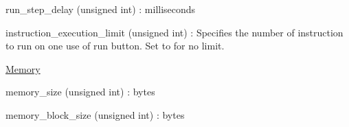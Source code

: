 \begin{DoxyItemize}
\begin{DoxyItemize}
\begin{DoxyItemize}
\item {\ttfamily run\+\_\+step\+\_\+delay} (unsigned int) \+: milliseconds
\item {\ttfamily instruction\+\_\+execution\+\_\+limit} (unsigned int) \+: Specifies the number of instruction to run on one use of {\ttfamily run} button. Set to {} for no limit.
\end{DoxyItemize}
\item {\ttfamily \mbox{\hyperlink{classMemory}{Memory}}}
\begin{DoxyItemize}
\item {\ttfamily memory\+\_\+size} (unsigned int) \+: bytes
\item {\ttfamily memory\+\_\+block\+\_\+size} (unsigned int) \+: bytes ~\newline
 
\end{DoxyItemize}
\end{DoxyItemize}
\end{DoxyItemize}